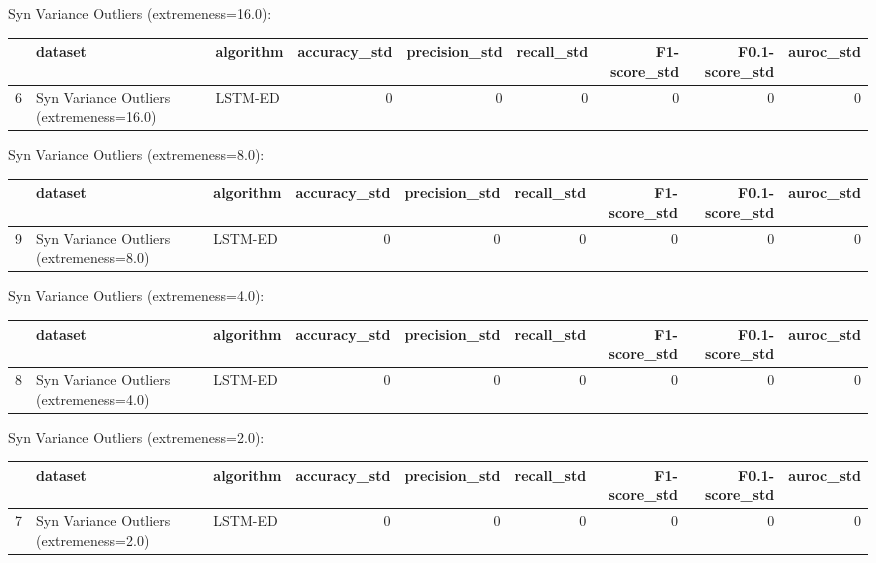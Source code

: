 Syn Variance Outliers (extremeness=16.0):

\begin{tabular}{rllrrrrrr}
\hline
    & dataset                                  & algorithm   &   accuracy\_std &   precision\_std &   recall\_std &   F1-score\_std &   F0.1-score\_std &   auroc\_std \\
\hline
  6 & Syn Variance Outliers (extremeness=16.0) & LSTM-ED     &              0 &               0 &            0 &              0 &                0 &           0 \\
\hline
\end{tabular}

Syn Variance Outliers (extremeness=8.0):

\begin{tabular}{rllrrrrrr}
\hline
    & dataset                                 & algorithm   &   accuracy\_std &   precision\_std &   recall\_std &   F1-score\_std &   F0.1-score\_std &   auroc\_std \\
\hline
  9 & Syn Variance Outliers (extremeness=8.0) & LSTM-ED     &              0 &               0 &            0 &              0 &                0 &           0 \\
\hline
\end{tabular}

Syn Variance Outliers (extremeness=4.0):

\begin{tabular}{rllrrrrrr}
\hline
    & dataset                                 & algorithm   &   accuracy\_std &   precision\_std &   recall\_std &   F1-score\_std &   F0.1-score\_std &   auroc\_std \\
\hline
  8 & Syn Variance Outliers (extremeness=4.0) & LSTM-ED     &              0 &               0 &            0 &              0 &                0 &           0 \\
\hline
\end{tabular}

Syn Variance Outliers (extremeness=2.0):

\begin{tabular}{rllrrrrrr}
\hline
    & dataset                                 & algorithm   &   accuracy\_std &   precision\_std &   recall\_std &   F1-score\_std &   F0.1-score\_std &   auroc\_std \\
\hline
  7 & Syn Variance Outliers (extremeness=2.0) & LSTM-ED     &              0 &               0 &            0 &              0 &                0 &           0 \\
\hline
\end{tabular}

